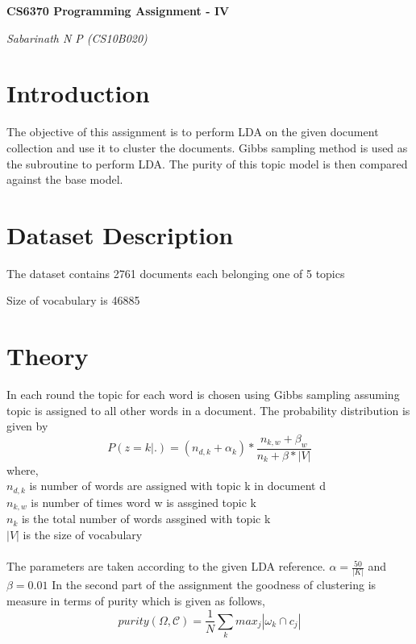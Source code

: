 \documentclass[a4paper,10pt]{report}
\newenvironment{my_itemize}{
\begin{itemize}
  \setlength{\itemsep}{1pt}
  \setlength{\parskip}{0pt}
  \setlength{\parsep}{0pt}}{
\end{itemize}}
\begin{document}
\renewcommand{\thesection}{1.\arabic{section}}

\begin{center}
\begin{Large}
\textbf{CS6370 Programming Assignment - IV}
\end{Large}
\vspace{5 mm}

\emph{Sabarinath N P (CS10B020)}
\end{center}
\vspace{5 mm}
\section*{Introduction}
The objective of this assignment is to perform LDA on the given document collection and use it to cluster the documents. Gibbs
sampling method is used as the subroutine to perform LDA. The purity of this topic model is then compared against the base model.
\section*{Dataset Description}
\begin{my_itemize}
 \item The dataset contains 2761 documents each belonging one of 5 topics
 \item Size of vocabulary is 46885
\end{my_itemize}
\section*{Theory}

In each round the topic for each word is chosen using Gibbs sampling assuming topic is assigned to all other words in a document.
The probability distribution is given by
\[ P(z = k | .) = (n_{d,k} + \alpha_k) * \frac{n_{k,w} + \beta_w}{n_k+\beta*|V|} \]
where, \\
$n_{d,k}$ is number of words are assigned with topic k in document d\\
$n_{k,w}$ is number of times word w is assgined topic k\\
$n_k$ is the total number of words assgined with topic k\\
$|V|$ is the size of vocabulary
\\\\
The parameters are taken according to the given LDA reference. $\alpha = \frac{50}{|K|}$ and $\beta = 0.01$
In the second part of the assignment the goodness of clustering is measure in terms of purity which is given as follows,
\[ purity(\Omega, \mathcal{C}) = \frac{1}{N}\sum_k max_j |\omega_k \cap c_j|\]
\end{document}
